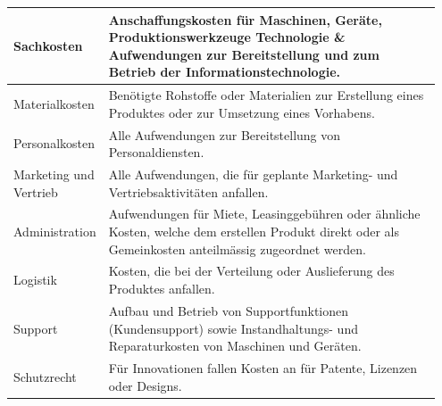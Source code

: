 \begin{tabular}{|p{0.15\linewidth}|p{0.8\linewidth}|}
	\hline 
	Sachkosten & Anschaffungskosten für Maschinen, Geräte, Produktionswerkzeuge	Technologie \& Aufwendungen zur Bereitstellung und zum Betrieb der Informationstechnologie.\\ \hline
	Materialkosten & Benötigte Rohstoffe oder Materialien zur Erstellung eines Produktes oder zur Umsetzung eines Vorhabens.\\ \hline
	Personalkosten & Alle Aufwendungen zur Bereitstellung von Personaldiensten.\\ \hline
	Marketing und Vertrieb & Alle Aufwendungen, die für geplante Marketing- und Vertriebsaktivitäten anfallen.\\ \hline
	Administration & Aufwendungen für Miete, Leasinggebühren oder ähnliche Kosten, welche dem erstellen Produkt direkt oder als Gemeinkosten anteilmässig zugeordnet werden.\\ \hline
	Logistik & Kosten, die bei der Verteilung oder Auslieferung des Produktes anfallen.\\ \hline
	Support & Aufbau und Betrieb von Supportfunktionen (Kundensupport) sowie Instandhaltungs- und Reparaturkosten von Maschinen und Geräten.\\ \hline
	Schutzrecht & Für Innovationen fallen Kosten an für Patente, Lizenzen oder Designs.\\ \hline
\end{tabular} 